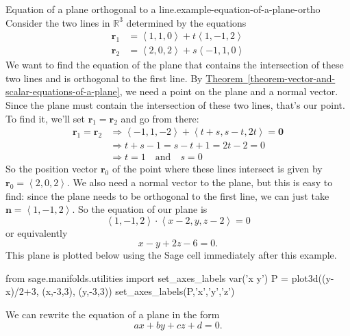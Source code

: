 \documentclass[10pt,]{book}
\numberwithin{equation}{section}
\newcommand{\RR}{\mathbb{R}}
\newcommand{\vv}[1]{\mathbf{#1}}
\newcommand{\dotprod}[1]{\left\langle #1 \right\rangle}
\begin{document}
\begin{example}{Equation of a plane orthogonal to a line.}{example-equation-of-a-plane-ortho}%
\hypertarget{p-1221}{}%
Consider the two lines in \(\RR^{3}\) determined by the equations%
%
\begin{align*}
\vv{r}_{1} & = \dotprod{1,1,0} + t\dotprod{1,-1,2} \\
\vv{r}_{2} & = \dotprod{2,0,2} + s\dotprod{-1,1,0} 
\end{align*}
\hypertarget{p-1222}{}%
We want to find the equation of the plane that contains the intersection of these two lines and is orthogonal to the first line. By \hyperref[theorem-vector-and-scalar-equations-of-a-plane]{Theorem~\ref{theorem-vector-and-scalar-equations-of-a-plane}}, we need a point on the plane and a normal vector. Since the plane must contain the intersection of these two lines, that's our point. To find it, we'll set \(\vv{r}_{1} = \vv{r}_{2}\) and go from there:%
%
\begin{align*}
\vv{r}_{1}=\vv{r}_{2} & \Rightarrow \dotprod{-1,1,-2} + \dotprod{t+s,s-t,2t} = \vv{0} \\
& \Rightarrow t+s-1 = s-t+1 = 2t-2 = 0 \\
& \Rightarrow t = 1\quad\text{and}\quad s=0 
\end{align*}
\hypertarget{p-1223}{}%
So the position vector \(\vv{r}_{0}\) of the point where these lines intersect is given by \(\vv{r}_{0} = \dotprod{2,0,2}\). We also need a normal vector to the plane, but this is easy to find: since the plane needs to be orthogonal to the first line, we can just take \(\vv{n} = \dotprod{1,-1,2}\). So the equation of our plane is%
%
\begin{equation*}
\dotprod{1,-1,2}\cdot\dotprod{x-2,y,z-2} = 0
\end{equation*}
\hypertarget{p-1224}{}%
or equivalently%
%
\begin{equation*}
x-y+2z -6 = 0.
\end{equation*}
\hypertarget{p-1225}{}%
This plane is plotted below using the Sage cell immediately after this example.%
\end{example}
\begin{sageinput}
from sage.manifolds.utilities import set_axes_labels
var('x y')
P = plot3d((y-x)/2+3, (x,-3,3), (y,-3,3)) 
set_axes_labels(P,'x','y','z')
\end{sageinput}
\hypertarget{p-1226}{}%
We can rewrite the equation of a plane in the form%
%
\begin{equation*}
ax+by+cz+d = 0.
\end{equation*}
\end{document}
